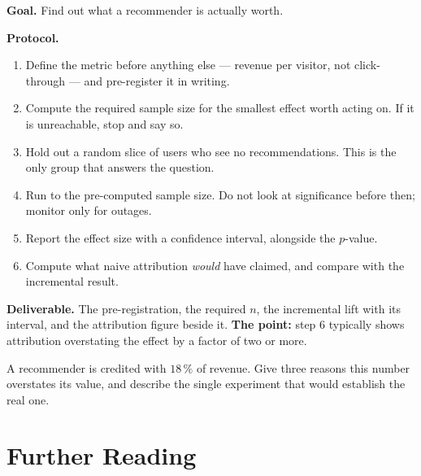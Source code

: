 \begin{practicallab}
\textbf{Goal.} Find out what a recommender is actually worth.

\textbf{Protocol.}
\begin{enumerate}
  \item Define the metric before anything else --- revenue per visitor, not
        click-through --- and pre-register it in writing.
  \item Compute the required sample size for the smallest effect worth acting
        on. If it is unreachable, stop and say so.
  \item Hold out a random slice of users who see no recommendations. This is
        the only group that answers the question.
  \item Run to the pre-computed sample size. Do not look at significance before
        then; monitor only for outages.
  \item Report the effect size with a confidence interval, alongside the
        $p$-value.
  \item Compute what naive attribution \emph{would} have claimed, and compare
        with the incremental result.
\end{enumerate}

\textbf{Deliverable.} The pre-registration, the required $n$, the incremental
lift with its interval, and the attribution figure beside it.
\textbf{The point:} step 6 typically shows attribution overstating the effect
by a factor of two or more.
\end{practicallab}

\begin{checkpoint}
A recommender is credited with $18\,\%$ of revenue. Give three reasons this
number overstates its value, and describe the single experiment that would
establish the real one.
\end{checkpoint}


\section{Further Reading}

